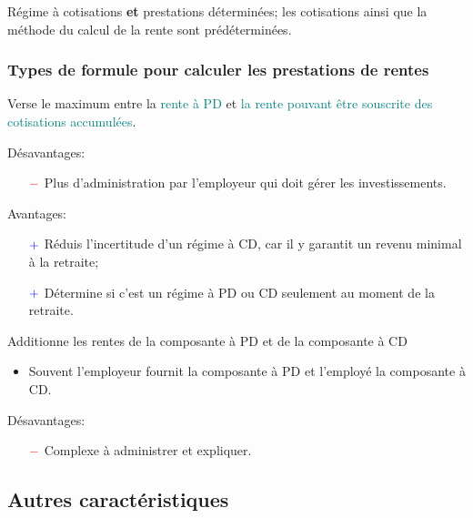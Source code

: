 \documentclass[10pt, french]{article}
\begin{document}
\begin{multicols*}{3}
\begin{definitionNOHFILL}[Description]
Régime à cotisations \textbf{et} prestations déterminées; les cotisations ainsi que la méthode du calcul de la rente sont prédéterminées.
\end{definitionNOHFILL}

\subsubsection*{Types de formule pour calculer les prestations de rentes}

\begin{definitionNOHFILL}
Verse le maximum entre la \textcolor{teal}{rente à PD} et \textcolor{teal}{la rente pouvant être souscrite des cotisations accumulées}.


Désavantages:
\begin{itemize}
	\item[$\color{red}-$]	Plus d'administration par l'employeur qui doit gérer les investissements.
\end{itemize} 

Avantages:
\begin{itemize}
	\item[$\color{blue}+$]	Réduis l'incertitude d'un régime à CD, car il y garantit un revenu minimal à la retraite;
	\item[$\color{blue}+$]	Détermine si c'est un régime à PD ou CD seulement au moment de la retraite.
\end{itemize}
\end{definitionNOHFILL}

\begin{definitionNOHFILL}[Combiné]
Additionne les rentes de la composante à PD et de la composante à CD

\begin{itemize}[leftmargin = *]
	\item	Souvent l'employeur fournit la composante à PD et l'employé la composante à CD.
\end{itemize}

Désavantages:
\begin{itemize}
	\item[$\color{red}-$]	Complexe à administrer et expliquer.
\end{itemize}
\end{definitionNOHFILL}

\columnbreak

\subsection*{Autres caractéristiques}


\end{multicols*}
\end{document}
